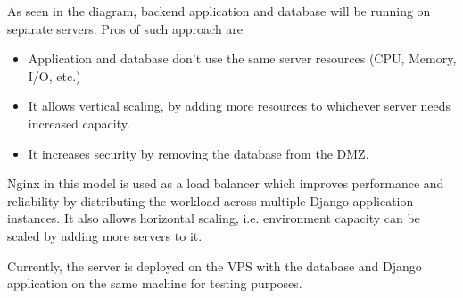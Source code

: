 As seen in the diagram, backend application and database will be running on separate servers. Pros of such approach are

\begin{itemize}
    \item Application and database don't use the same server resources (CPU, Memory, I/O, etc.)
    \item It allows vertical scaling, by adding more resources to whichever server needs increased capacity.
    \item It increases security by removing the database from the \ac{DMZ}.
\end{itemize}

Nginx in this model is used as a load balancer which improves performance and reliability by distributing the workload across multiple Django application instances. It also allows horizontal scaling, i.e. environment capacity can be scaled by adding more servers to it.

Currently, the server is deployed on the \ac{VPS} with the database and Django application on the same machine for testing purposes.
